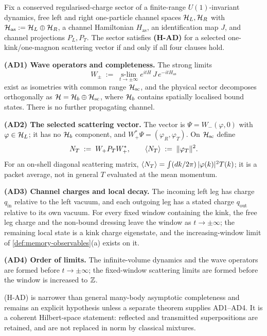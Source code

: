 \begin{definition}
\label{def:h-ad}
Fix a conserved regularised-charge sector of a finite-range $U(1)$-invariant
dynamics, free left and right one-particle channel spaces $\mathcal{H}_L,\mathcal{H}_R$
with $\mathcal{H}_{\mathrm{as}}:=\mathcal{H}_L\oplus\mathcal{H}_R$, a channel Hamiltonian
$H_{\mathrm{as}}$, an identification map $J$, and channel projections
$P_L,P_T$. The sector satisfies \textbf{(H-AD)} for a selected
one-kink/one-magnon scattering vector if and only if all four clauses hold.

\smallskip
\noindent\textbf{(AD1) Wave operators and completeness.} The strong limits
\begin{equation}
  W_\pm\;:=\;\operatorname*{s-lim}_{t\to\pm\infty}
  e^{itH}\,J\,e^{-itH_{\mathrm{as}}}
  \label{eq:AD1}
\end{equation}
exist as isometries with common range $\mathcal{H}_{\mathrm{sc}}$, and the physical
sector decomposes orthogonally as
$\mathcal{H}=\mathcal{H}_b\oplus\mathcal{H}_{\mathrm{sc}}$, where $\mathcal{H}_b$ contains spatially
localised bound states. There is no further propagating channel.

\smallskip
\noindent\textbf{(AD2) The selected scattering vector.} The vector is
$\Psi=W_-(\varphi,0)$ with $\varphi\in\mathcal{H}_L$; it has no $\mathcal{H}_b$ component,
and $W_+^*\Psi=(\varphi_R,\varphi_T)$. On $\mathcal{H}_{\mathrm{sc}}$ define
\begin{equation}
  N_T\;:=\;W_+P_TW_+^*,\qquad \langle N_T\rangle\;:=\;\lVert \varphi_T\rVert^2 .
  \label{eq:AD2}
\end{equation}
For an on-shell diagonal scattering matrix,
$\langle N_T\rangle=\int(dk/2\pi)\,|\varphi(k)|^2T(k)$; it is a packet average, not
in general $T$ evaluated at the mean momentum.

\smallskip
\noindent\textbf{(AD3) Channel charges and local decay.} The incoming left leg
has charge $q_{\mathrm{in}}$ relative to the left vacuum, and each outgoing leg
has a stated charge $q_{\mathrm{out}}$ relative to its own vacuum. For every
fixed window containing the kink, the free leg charge and the non-bound
dressing leave the window as $t\to\pm\infty$; the remaining local state is a
kink charge eigenstate, and the increasing-window limit of
\cref{def:memory-observables}(a) exists on it.

\smallskip
\noindent\textbf{(AD4) Order of limits.} The infinite-volume dynamics and the
wave operators are formed before $t\to\pm\infty$; the fixed-window scattering
limits are formed before the window is increased to $\mathbb{Z}$.

\smallskip
(H-AD) is narrower than general many-body asymptotic completeness and remains
an explicit hypothesis unless a separate theorem supplies AD1--AD4. It is a
coherent Hilbert-space statement: reflected and transmitted superpositions are
retained, and are not replaced in norm by classical mixtures.
\end{definition}

